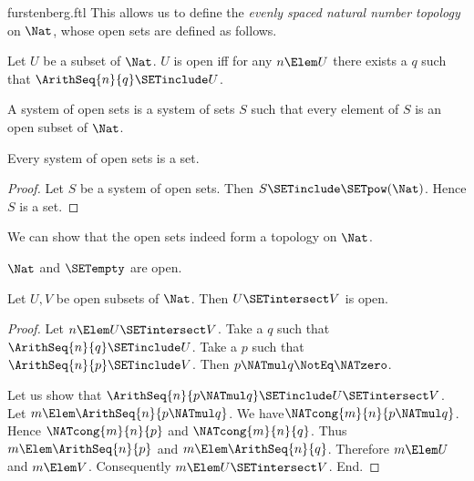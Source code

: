 \documentclass{stex}
\begin{document}
\begin{smodule}{furstenberg.ftl}
This allows us to define the \textit{evenly spaced natural number
topology} on $\Nat$, whose open sets are defined as follows.

\begin{forthel}
  \begin{definition}[for=open]
    Let $U$ be a subset of $\Nat$.
    $U$ is open iff for any $n \Elem U$ there exists a $q$ such that
    $\ArithSeq{n}{q} \SETinclude U$.
  \end{definition}

  \begin{definition}[for=system of open sets]
    A system of open sets is a system of sets $S$ such that every element of
    $S$ is an open subset of $\Nat$.
  \end{definition}

  \begin{lemma}
    Every system of open sets is a set.
  \end{lemma}
  \begin{proof}
    Let $S$ be a system of open sets.
    Then $S \SETinclude \SETpow(\Nat)$.
    Hence $S$ is a set.
  \end{proof}
\end{forthel}

We can show that the open sets indeed form a topology on $\Nat$.

\begin{forthel}
  \begin{lemma}
    $\Nat$ and $\SETempty$ are open.
  \end{lemma}

  \begin{lemma}
    Let $U,V$ be open subsets of $\Nat$.
    Then $U \SETintersect V$ is open.
  \end{lemma}
  \begin{proof}
    Let $n \Elem U \SETintersect V$.
    Take a $q$ such that $\ArithSeq{n}{q} \SETinclude U$.
    Take a $p$ such that $\ArithSeq{n}{p} \SETinclude V$.
    Then $p \NATmul q \NotEq \NATzero$.

    Let us show that $\ArithSeq{n}{p \NATmul q} \SETinclude U \SETintersect V$.
      Let $m \Elem \ArithSeq{n}{p \NATmul q}$.
      We have\linebreak $\NATcong{m}{n}{p \NATmul q}$.
      Hence $\NATcong{m}{n}{p}$ and $\NATcong{m}{n}{q}$.
      Thus $m \Elem \ArithSeq{n}{p}$ and $m \Elem \ArithSeq{n}{q}$.
      Therefore $m \Elem U$ and $m \Elem V$.
      Consequently $m \Elem U \SETintersect V$.
    End.
  \end{proof}


\end{forthel}
\end{smodule}
\end{document}

